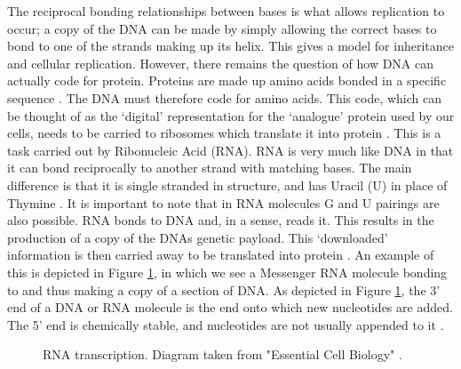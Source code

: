 \documentclass{cshonours}
\begin{document}
The reciprocal bonding relationships between bases is what allows replication to occur; a copy of the DNA can be made by simply allowing the correct bases to bond to one of the strands making up its helix. This gives a model for inheritance and cellular replication. However, there remains the question of how DNA can actually code for protein. Proteins are made up amino acids bonded in a specific sequence \cite{albertsessential}. The DNA must therefore code for amino acids. This code, which can be thought of as the `digital' representation for the `analogue' protein used by our cells, needs to be carried to ribosomes which translate it into protein \cite{albertsessential}. This is a task carried out by Ribonucleic Acid (RNA). RNA is very much like DNA in that it can bond reciprocally to another strand with matching bases. The main difference is that it is single stranded in structure, and has Uracil (U) in place of Thymine \cite{albertsessential}. It is important to note that in RNA molecules G and U pairings are also possible. RNA bonds to DNA and, in a sense, reads it. This results in the production of a copy of the DNAs genetic payload. This `downloaded' information is then carried away to be translated into protein \cite{albertsessential}. An example of this is depicted in Figure \ref{transcription}, in which we see a Messenger RNA molecule bonding to and thus making a copy of a section of DNA. As depicted in Figure \ref{transcription}, the 3' end of a DNA or RNA molecule is the end onto which new nucleotides are added. The 5' end is chemically stable, and nucleotides are not usually appended to it \cite{albertsessential}.

\begin{figure}
\begin{center}
\end{center}
\caption{RNA transcription. Diagram taken from "Essential Cell Biology" \cite{albertsessential}.}
\label{transcription}
\end{figure}
\end{document}
